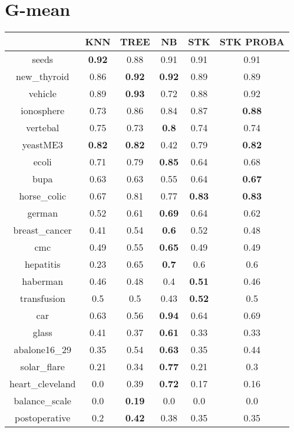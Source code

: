 \documentclass{article}%
\begin{document}
\section*{G{-}mean}%
\begin{tabular}{c|ccccc}%
&KNN&TREE&NB&STK&STK PROBA\\%
\hline%
seeds&\textbf{0.92}&0.88&0.91&0.91&0.91\\%
new\_thyroid&0.86&\textbf{0.92}&\textbf{0.92}&0.89&0.89\\%
vehicle&0.89&\textbf{0.93}&0.72&0.88&0.92\\%
ionosphere&0.73&0.86&0.84&0.87&\textbf{0.88}\\%
vertebal&0.75&0.73&\textbf{0.8}&0.74&0.74\\%
yeastME3&\textbf{0.82}&\textbf{0.82}&0.42&0.79&\textbf{0.82}\\%
ecoli&0.71&0.79&\textbf{0.85}&0.64&0.68\\%
bupa&0.63&0.63&0.55&0.64&\textbf{0.67}\\%
horse\_colic&0.67&0.81&0.77&\textbf{0.83}&\textbf{0.83}\\%
german&0.52&0.61&\textbf{0.69}&0.64&0.62\\%
breast\_cancer&0.41&0.54&\textbf{0.6}&0.52&0.48\\%
cmc&0.49&0.55&\textbf{0.65}&0.49&0.49\\%
hepatitis&0.23&0.65&\textbf{0.7}&0.6&0.6\\%
haberman&0.46&0.48&0.4&\textbf{0.51}&0.46\\%
transfusion&0.5&0.5&0.43&\textbf{0.52}&0.5\\%
car&0.63&0.56&\textbf{0.94}&0.64&0.69\\%
glass&0.41&0.37&\textbf{0.61}&0.33&0.33\\%
abalone16\_29&0.35&0.54&\textbf{0.63}&0.35&0.44\\%
solar\_flare&0.21&0.34&\textbf{0.77}&0.21&0.3\\%
heart\_cleveland&0.0&0.39&\textbf{0.72}&0.17&0.16\\%
balance\_scale&0.0&\textbf{0.19}&0.0&0.0&0.0\\%
postoperative&0.2&\textbf{0.42}&0.38&0.35&0.35\\%
\end{tabular}

%
\end{document}
